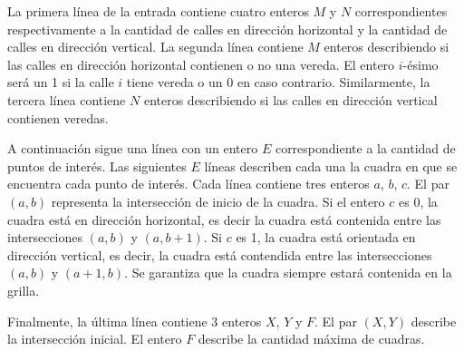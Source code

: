 \documentclass{oci}
\newcommand{\NS}[1]{\texttt{#1NS}}
\renewcommand{\OE}[1]{\texttt{#1OE}}
\begin{document}
\begin{problemDescription}

  \begin{center}
  \end{center}


\end{problemDescription}

\begin{inputDescription}
  La primera línea de la entrada contiene cuatro enteros $M$ y $N$ correspondientes respectivamente
  a la cantidad de calles en dirección horizontal y la cantidad de calles en dirección vertical.
  La segunda línea contiene $M$ enteros describiendo si las calles en dirección horizontal
  contienen o no una vereda.
  El entero $i$-ésimo será un 1 si la calle $i$ tiene vereda o un 0 en caso contrario.
  Similarmente, la tercera línea contiene $N$ enteros describiendo si las calles en dirección
  vertical contienen veredas.

  A continuación sigue una línea con un entero $E$ correspondiente a la cantidad de puntos de interés.
  Las siguientes $E$ líneas describen cada una la cuadra en que se encuentra cada punto de interés.
  Cada línea contiene tres enteros $a$, $b$, $c$.
  El par $(a, b)$ representa la intersección de inicio de la cuadra.
  Si el entero $c$ es 0, la cuadra está en dirección horizontal, es decir la cuadra está contenida entre las
  intersecciones $(a, b)$ y $(a, b + 1)$.
  Si $c$ es 1, la cuadra está orientada en dirección vertical, es decir, la cuadra está contendida entre
  las intersecciones $(a, b)$ y $(a + 1, b)$.
  Se garantiza que la cuadra siempre estará contenida en la grilla.

  Finalmente, la última línea contiene 3 enteros $X$, $Y$ y $F$.
  El par $(X, Y)$ describe la intersección inicial.
  El entero $F$ describe la cantidad máxima de cuadras.
\end{inputDescription}
\end{document}
